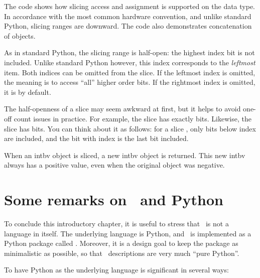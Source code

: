The code shows how slicing access and assignment is supported on the
 data type. In accordance with the most common hardware
convention, and unlike standard Python, slicing ranges are
downward. The code also demonstrates concatenation of 
objects.

As in standard Python, the slicing range is half-open: the highest
index bit is not included. Unlike standard Python however, this index
corresponds to the \emph{leftmost} item. Both indices can be omitted
from the slice. If the leftmost index is omitted, the meaning is to
access ``all'' higher order bits.  If the rightmost index is omitted,
it is  by default.

The half-openness of a slice may seem awkward at first, but it helps
to avoid one-off count issues in practice. For example, the slice
 has exactly  bits. Likewise, the slice
 has  bits. You can think about it as
follows: for a slice \code{[i:j]}, only bits below index  are
included, and the bit with index  is the last bit included.

When an intbv object is sliced, a new intbv object is returned. This
new intbv always has a positive value, even when the original object
was negative.


\section{Some remarks on \myhdl\ and Python \label{intro-python}}

To conclude this introductory chapter, it is useful to stress that
\myhdl\ is not a language in itself. The underlying language is Python, 
and \myhdl\ is implemented as a Python package called .
Moreover, it is a design goal to keep the  package as
minimalistic as possible, so that \myhdl\ descriptions are very much
``pure Python''.

To have Python as the underlying language is significant in several
ways:


